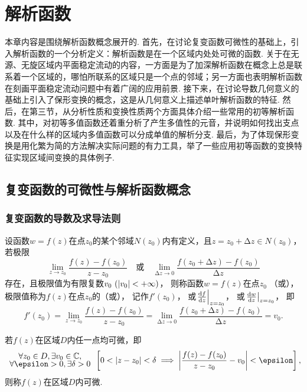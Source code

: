 \chapter{解析函数}
本章内容是围绕解析函数概念展开的.
首先，在讨论复变函数可微性的基础上，引入解析函数的一个分析定义：解析函数是在一个区域内处处可微的函数.
关于在无源、无旋区域内平面稳定流动的内容，一方面是为了加深解析函数在概念上总是联系着一个区域的，哪怕所联系的区域只是一个点的邻域；另一方面也表明解析函数在刻画平面稳定流动问题中有着广阔的应用前景.
接下来，在讨论导数几何意义的基础上引入了保形变换的概念，这是从几何意义上描述单叶解析函数的特征.
然后，在第三节，从分析性质和变换性质两个方面具体介绍一些常用的初等解析函数.
其中，对初等多值函数还着重分析了产生多值性的元音，并说明如何找出支点以及在什么样的区域内多值函数可以分成单值的解析分支.
最后，为了体现保形变换是用化繁为简的方法解决实际问题的有力工具，举了一些应用初等函数的变换特征实现区域间变换的具体例子.

\section{复变函数的可微性与解析函数概念}
\subsection{复变函数的导数及求导法则}
\begin{definition}
设函数\(w=f(z)\)在点\(z_0\)的某个邻域\(N(z_0)\)内有定义，且\(z=z_0+\increment z \in N(z_0)\)，若极限\[
\lim_{z \to z_0} \frac{f(z)-f(z_0)}{z-z_0}
\quad\text{或}\quad
\lim_{\increment z\to0} \frac{f(z_0+\increment z)-f(z_0)}{\increment z}
\]存在，且极限值为有限复数\(v_0\ (\abs{v_0}<+\infty)\)，
则称函数\(w=f(z)\)在点\(z_0\) （或），
极限值称为\(f(z)\)在点\(z_0\)的（或），
记作\(f'(z_0)\)，
或\(\eval{\dv{f}{z}}_{z=z_0}\)，
或\(\eval{\dv{w}{z}}_{z=z_0}\)，
即\begin{equation}\label{equation:解析函数.导数的定义式}
	f'(z_0)
	= \lim_{z \to z_0} \frac{f(z)-f(z_0)}{z-z_0}
	= \lim_{\increment z\to0} \frac{f(z_0+\increment z)-f(z_0)}{\increment z}
	= v_0.
\end{equation}

若\(f(z)\)在区域\(D\)内任一点均可微，即\[
{ \def\arraystretch{.7} \begin{array}{c}
\forall z_0 \in D, \exists v_0 \in \mathbb{C}, \\
\forall \epsilon > 0, \exists \delta > 0
\end{array} }
\left[
0 < \abs{z - z_0} < \delta
\implies
\abs{\frac{f(z) - f(z_0)}{z - z_0} - v_0} < \epsilon
\right],
\]则称\(f(z)\)在区域\(D\)内可微.
\end{definition}

